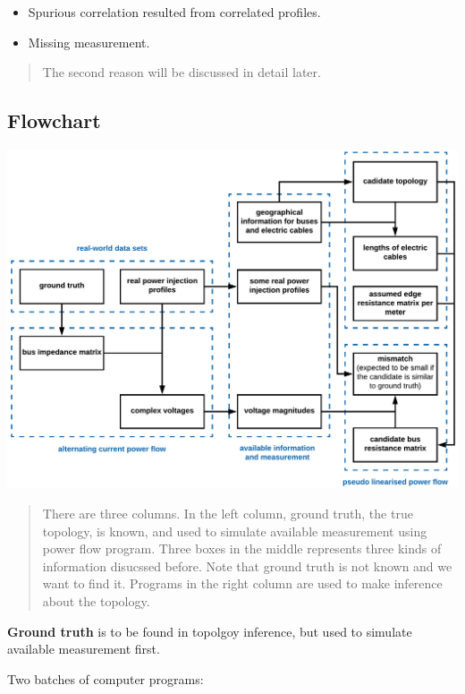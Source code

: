 \documentclass[
]{book}
\providecommand{\tightlist}{%
  \setlength{\itemsep}{0pt}\setlength{\parskip}{0pt}}
\begin{document}
\begin{itemize}
\tightlist
\item
  Spurious correlation resulted from correlated profiles.
\item
  Missing measurement.
\end{itemize}

\begin{quote}
The second reason will be discussed in detail later.
\end{quote}

\hypertarget{flowchart}{%
\subsection*{Flowchart}\label{flowchart}}

\includegraphics{Pictures/figFlowchart3.png}

\begin{quote}
There are three columns. In the left column, ground truth, the true topology,
is known, and used to simulate available measurement using power flow
program. Three boxes in the middle represents three kinds of information
disucssed before. Note that ground truth is not known and we want to find it.
Programs in the right column are used to make inference about the topology.
\end{quote}

\textbf{Ground truth} is to be found in topolgoy inference, but used to simulate
available measurement first.

Two batches of computer programs:
\end{document}
